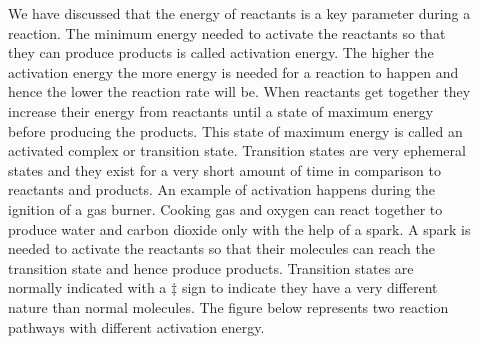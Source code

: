 \documentclass[main.tex]{subfiles}
\newcommand\chapterlabel{Ch-kinetics}
\begin{document}
\begin{description}
\item[] 
We have discussed that the energy of reactants is a key parameter during a reaction. The minimum energy needed to activate the reactants so that they can produce products is called activation energy. The higher the activation energy the more energy is needed for a reaction to happen and hence the lower the reaction rate will be. When reactants get together they increase their energy from reactants until a state of maximum energy before producing the products. This state of maximum energy is called an activated complex or transition state. Transition states are very ephemeral states and they exist for a very short amount of time in comparison to reactants and products. An example of activation happens during the ignition of a gas burner. Cooking gas and oxygen can react together to produce water and carbon dioxide only with the help of a spark. A spark is needed to activate the reactants so that their molecules can reach the transition state and hence produce products. Transition states are normally indicated with a $\ddag$  sign to indicate they have a very different nature than normal molecules. The figure below represents two reaction pathways with different activation energy.
\begin{minipage}[b]{1.0\linewidth}
\end{minipage}
\end{description}
\end{document}
